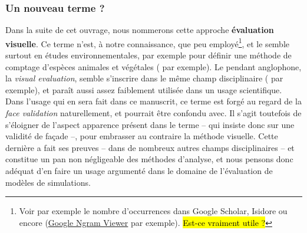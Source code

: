 \subsubsection{Un nouveau terme ?} Dans la suite de cet ouvrage, nous nommerons cette approche \og \textbf{évaluation visuelle}\fg{}. Ce terme n'est, à notre connaissance, que peu employé\footnote{
	Voir par exemple le nombre d'occurrences dans Google Scholar, Isidore ou encore (\href{https://books.google.com/ngrams/graph?content=visual+validity\%2Cface+validity\%2Cface+validation\%2Cvisual+validation\%2Cvisual+evaluation\&case_insensitive=on\&year_start=1950\&year_end=2008\&corpus=15\&smoothing=2\&share=\&direct_url=t1\%3B\%2Cvisual\%20validity\%3B\%2Cc0\%3B.t4\%3B\%2Cface\%20validity\%3B\%2Cc0\%3B\%2Cs0\%3B\%3Bface\%20validity\%3B\%2Cc0\%3B\%3BFace\%20validity\%3B\%2Cc0\%3B\%3BFace\%20Validity\%3B\%2Cc0\%3B.t4\%3B\%2Cface\%20validation\%3B\%2Cc0\%3B\%2Cs0\%3B\%3Bface\%20validation\%3B\%2Cc0\%3B\%3BFace\%20validation\%3B\%2Cc0\%3B.t1\%3B\%2Cvisual\%20validation\%3B\%2Cc0\%3B.t4\%3B\%2Cvisual\%20evaluation\%3B\%2Cc0\%3B\%2Cs0\%3B\%3Bvisual\%20evaluation\%3B\%2Cc0\%3B\%3BVisual\%20evaluation\%3B\%2Cc0\%3B\%3BVisual\%20Evaluation\%3B\%2Cc0\%3B\%3BVISUAL\%20EVALUATION\%3B\%2Cc0}{Google Ngram Viewer} par exemple). \hl{Est-ce vraiment utile ?}
}, et le semble surtout en études environnementales, par exemple pour définir une méthode de comptage d'espèces animales et végétales (\cite{harmelin-vivien_evaluation_1985} par exemple).
Le pendant anglophone, la \og \textit{visual evaluation}\fg{}, semble s'inscrire dans le même champ disciplinaire (\cite{horst_assessment_1984} par exemple), et paraît aussi assez faiblement utilisée dans un usage scientifique.
Dans l'usage qui en sera fait dans ce manuscrit, ce terme est forgé au regard de la \og \textit{face validation}\fg{} naturellement, et pourrait être confondu avec. Il s'agit toutefois de s'éloigner de l'aspect \og apparence\fg{} présent dans le terme -- qui insiste donc sur une validité de façade --, pour embrasser au contraire la méthode visuelle.
Cette dernière a fait ses preuves -- dans de nombreux autres champs disciplinaires -- et constitue un pan non négligeable des méthodes d'analyse, et nous pensons donc adéquat d'en faire un usage argumenté dans le domaine de l'évaluation de modèles de simulations.
